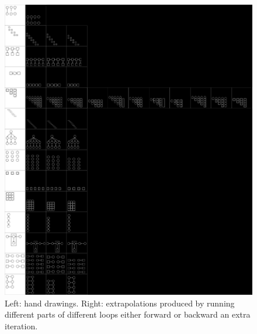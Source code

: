\documentclass{article}
\newcommand{\remark}[1]{\textcolor{red}{[#1]}}
\begin{document}
\begin{figure}
  \includegraphics[width = 8in]{figures/extrapolationMatrix.png}
  \caption{Left: hand drawings. Right: extrapolations produced by
    running different parts of different loops either forward or
    backward an extra iteration.}\label{extrapolationFigure}
  \end{figure}
%



\end{document}
